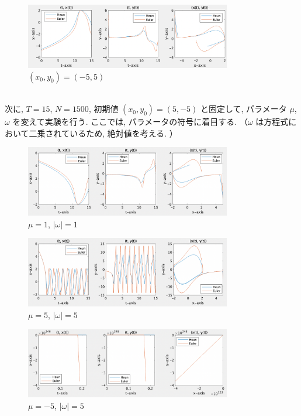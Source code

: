 \documentclass[11pt]{jsarticle}
\begin{document}
\begin{figure}[htbp]
\centering
\includegraphics[width=9cm]{images/1_b_1_np*.png}
\caption{$(x_{0}, y_{0}) = (-5, 5)$}
\end{figure}
\ \\
次に, $T = 15$, $N = 1500$, 初期値 $(x_{0}, y_{0}) = (5, -5)$ と固定して, パラメータ $\mu$, $\omega$ を変えて実験を行う. ここでは, パラメータの符号に着目する. （$\omega$ は方程式において二乗されているため, 絶対値を考える. ）

\begin{figure}[htbp]
\centering
\includegraphics[width=9cm]{images/1_b_2_iti*.png}
\caption{$\mu = 1$, $|\omega| = 1$}
\end{figure}

\begin{figure}[htbp]
\centering
\includegraphics[width=9cm]{images/1_b_2_pp*.png}
\caption{$\mu = 5$, $|\omega| = 5$}
\end{figure}

\begin{figure}[htbp]
\centering
\includegraphics[width=9cm]{images/1_b_2_nn*.png}
\caption{$\mu = -5$, $|\omega| = 5$}
\end{figure}
\end{document}
